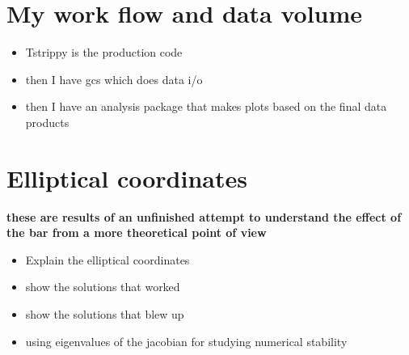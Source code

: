 \section{My work flow and data volume}
    \begin{itemize}
        \item Tstrippy is the production code
        \item then I have gcs which does data i/o
        \item then I have an analysis package that makes plots based on the final data products
    \end{itemize}

\section{Elliptical coordinates}
    \textbf{these are results of an unfinished attempt to understand the effect of the bar from a more theoretical point of view}
    \begin{itemize}
        \item Explain the elliptical coordinates 
        \item show the solutions that worked
        \item show the solutions that blew up 
        \item using eigenvalues of the jacobian for studying numerical stability 
    \end{itemize}